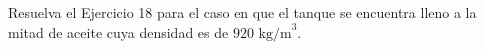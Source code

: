 \item Resuelva el Ejercicio 18 para el caso en que el tanque se encuentra lleno a la mitad de aceite cuya densidad es de $920 \text{ kg/m}^3$.
